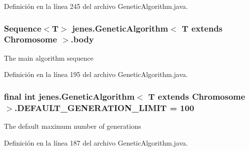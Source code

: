 Definición en la línea 245 del archivo Genetic\-Algorithm.\-java.

\hypertarget{classjenes_1_1_genetic_algorithm_3_01_t_01extends_01_chromosome_01_4_a0040f9dbb0018e8bb28dde97dacac7d8}{
\subsubsection[{body}]{\setlength{\rightskip}{0pt plus 5cm}Sequence$<$T$>$ jenes.\-Genetic\-Algorithm$<$ T extends Chromosome $>$.body\hspace{0.3cm}{\ttfamily [protected]}}}\label{classjenes_1_1_genetic_algorithm_3_01_t_01extends_01_chromosome_01_4_a0040f9dbb0018e8bb28dde97dacac7d8}
The main algorithm sequence 

Definición en la línea 195 del archivo Genetic\-Algorithm.\-java.

\hypertarget{classjenes_1_1_genetic_algorithm_3_01_t_01extends_01_chromosome_01_4_a2492ee1b00f5631a1c1b1c6f15ea3421}{
\subsubsection[{D\-E\-F\-A\-U\-L\-T\-\_\-\-G\-E\-N\-E\-R\-A\-T\-I\-O\-N\-\_\-\-L\-I\-M\-I\-T}]{\setlength{\rightskip}{0pt plus 5cm}final int jenes.\-Genetic\-Algorithm$<$ T extends Chromosome $>$.D\-E\-F\-A\-U\-L\-T\-\_\-\-G\-E\-N\-E\-R\-A\-T\-I\-O\-N\-\_\-\-L\-I\-M\-I\-T = 100\hspace{0.3cm}{\ttfamily [static]}}}\label{classjenes_1_1_genetic_algorithm_3_01_t_01extends_01_chromosome_01_4_a2492ee1b00f5631a1c1b1c6f15ea3421}
The default maximum number of generations 

Definición en la línea 187 del archivo Genetic\-Algorithm.\-java.

